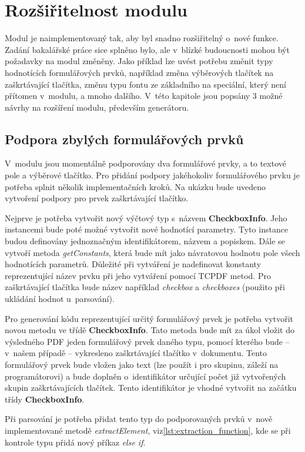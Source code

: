 \chapter{Rozšiřitelnost modulu}
Modul je naimplementovaný tak, aby byl snadno rozšiřitelný o~nové funkce. Zadání bakalářské práce sice splněno bylo, ale v~blízké budoucnosti mohou být požadavky na modul změněny. Jako příklad lze uvést potřebu změnit typy hodnotících formulářových prvků, například změna výběrových tlačítek na zaškrtávající tlačítka, změnu typu fontu ze základního na speciální, který není přítomen v~modulu, a mnoho dalšího. V~této kapitole jsou popsány 3 možné návrhy na rozšíření modulu, především generátoru.

\section{Podpora zbylých formulářových prvků}
V~modulu jsou momentálně podporovány dva formulářové prvky, a to textové pole a výběrové tlačítko. Pro přidání podpory jakéhokoliv formulářového prvku je potřeba splnit několik implementačních kroků. Na ukázku bude uvedeno vytvoření podpory pro prvek zaškrtávající tlačítko.
\par
Nejprve je potřeba vytvořit nový výčtový typ s~názvem \textbf{CheckboxInfo}. Jeho instancemi bude poté možné vytvořit nové hodnotící parametry. Tyto instance budou definovány jednoznačným identifikátorem, názvem a popiskem. Dále se vytvoří metoda \textit{getConstants}, která bude mít jako návratovou hodnotu pole všech hodnotících parametrů. Důležité při vytváření je nadefinovat konstanty reprezentující název prvku při jeho vytváření pomocí TCPDF metod. Pro zaškrtávající tlačítka bude název například \textit{checkbox} a \textit{checkboxes} (použito při ukládání hodnot u~parsování).
\par
Pro generování kódu reprezentující určitý formulářový prvek je potřeba vytvořit novou metodu ve třídě \textbf{CheckboxInfo}. Tato metoda bude mít za úkol vložit do výsledného PDF jeden formulářový prvek daného typu, pomocí kterého bude -- v~našem případě -- vykresleno zaškrtávající tlačítko v~dokumentu. Tento formulářový prvek bude vložen jako text  (lze použít i pro skupinu, záleží na programátorovi) a bude doplněn o~identifikátor určující počet již vytvořených skupin zaškrtávajících tlačítek. Tento identifikátor je vhodné vytvořit na začátku třídy \textbf{CheckboxInfo}.
\par
Při parsování je potřeba přidat tento typ do podporovaných prvků v~nově implementované metodě \textit{extractElement}, viz\ref{lst:extraction_function}, kde se při kontrole typu přidá nový příkaz \textit{else if}.
